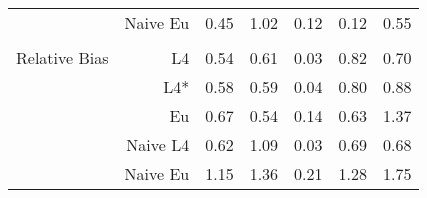 \documentclass[a4paper,12pt,twoside]{book}
\begin{document}
\begin{table}[H]
\begin{tabular}{crrrrrr}
&Naive Eu &  0.45 & 1.02 & 0.12 & 0.12 & 0.55 \\\\

   \hline
   
{\color{blue} Relative Bias } & L4  &0.54 & 0.61 & 0.03 & 0.82 & 0.70 \\ 
 
&L4*  & 0.58 & 0.59 & 0.04 & 0.80 & 0.88 \\ 
  
 
  
&Eu &  
 0.67 & 0.54 & 0.14 & 0.63 & 1.37 \\ 

&Naive L4&  
  
    0.62 & 1.09 & 0.03 & 0.69 & 0.68 \\ 
 
  
&Naive Eu &  
    1.15 & 1.36 & 0.21 & 1.28 & 1.75 \\ 
 
\end{tabular}

\end{table}
\end{document}
